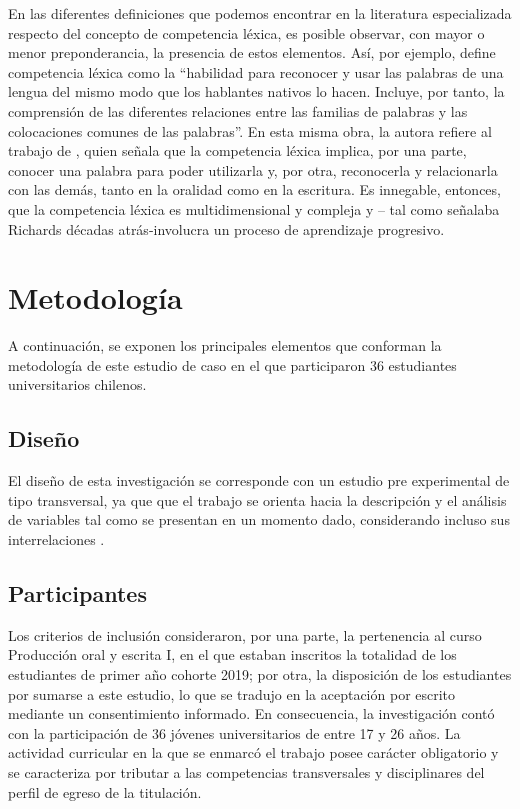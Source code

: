 \documentclass{textolivre}
\begin{document}
En las diferentes definiciones que podemos encontrar en la literatura
especializada respecto del concepto de competencia léxica, es posible observar,
con mayor o menor preponderancia, la presencia de estos elementos. Así, por
ejemplo, \textcite[p. 57]{molina2007} define competencia léxica como la
“habilidad para reconocer y usar las palabras de una lengua del mismo modo que
los hablantes nativos lo hacen. Incluye, por tanto, la comprensión de las
diferentes relaciones entre las familias de palabras y las colocaciones comunes
de las palabras”. En esta misma obra, la autora refiere al trabajo de \textcite[p. 152]{catalan2002},
quien señala que la competencia léxica implica, por
una parte, conocer una palabra para poder utilizarla y, por otra, reconocerla y
relacionarla con las demás, tanto en la oralidad como en la escritura. Es
innegable, entonces, que la competencia léxica es multidimensional y compleja y
-- tal como señalaba Richards décadas atrás-involucra un proceso de aprendizaje
progresivo.



\section{Metodología}\label{sec-metodologia}
A continuación, se exponen los principales elementos que conforman
la metodología de este estudio de caso en el que participaron 36 estudiantes
universitarios chilenos.

\subsection{Diseño}\label{sec-diseno}
El diseño de esta investigación se corresponde con un estudio pre experimental
de tipo transversal, ya que que el trabajo se orienta hacia la descripción y el
análisis de variables tal como se presentan en un momento dado, considerando
incluso sus interrelaciones \cite{acuna2006}.

\subsection{Participantes}\label{sec-participantes}
Los criterios de inclusión consideraron, por una parte, la pertenencia al
curso Producción oral y escrita I, en el que estaban inscritos la totalidad de
los estudiantes de primer año cohorte 2019; por otra, la disposición de los
estudiantes por sumarse a este estudio, lo que se tradujo en la aceptación por
escrito mediante un consentimiento informado. En consecuencia, la investigación
contó con la participación de 36 jóvenes universitarios de entre 17 y 26 años.
La actividad curricular en la que se enmarcó el trabajo posee carácter
obligatorio y se caracteriza por tributar a las competencias transversales y
disciplinares del perfil de egreso de la titulación.
\end{document}
